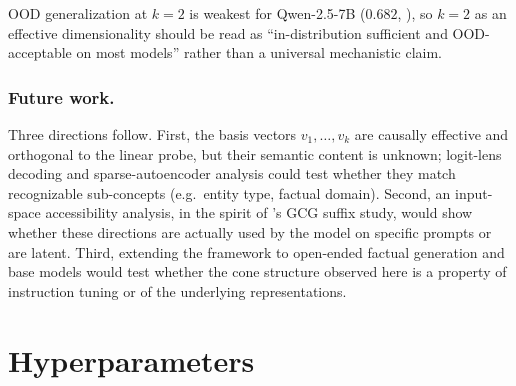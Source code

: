 \documentclass[sn-basic]{sn-jnl}
\begin{document}
OOD generalization at $k=2$ is weakest for Qwen-2.5-7B ($0.682$,
), so $k=2$ as an effective dimensionality should be read as
``in-distribution sufficient and OOD-acceptable on most models'' rather than a
universal mechanistic claim.

\subsubsection*{Future work.}
Three directions follow. First, the basis vectors $v_1, \ldots, v_k$ are
causally effective and orthogonal to the linear probe, but their semantic
content is unknown; logit-lens decoding and sparse-autoencoder analysis could
test whether they match recognizable sub-concepts (e.g.\ entity type, factual
domain). Second, an input-space accessibility analysis, in the spirit of
\cite{wollschlagerGeometryRefusalLarge2025}'s GCG suffix study, would show
whether these directions are actually used by the model on specific prompts or
are latent. Third, extending the framework to open-ended factual generation and
base models would test whether the cone structure observed here is a property of
instruction tuning or of the underlying representations.




\appendix
\section{Hyperparameters}



\end{document}
